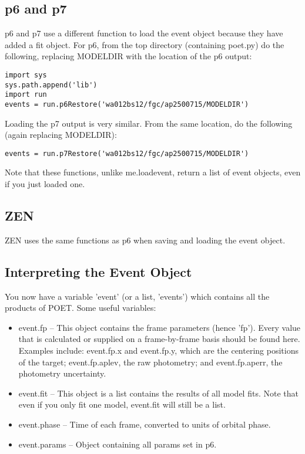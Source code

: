 \documentclass[letterpaper,12pt]{article}
\begin{document}
\subsection{p6 and p7}
p6 and p7 use a different function to load the event object because
they have added a fit object. For p6, from the top directory
(containing poet.py) do the following, replacing MODELDIR with the
location of the p6 output:

\begin{verbatim}
import sys
sys.path.append('lib')
import run
events = run.p6Restore('wa012bs12/fgc/ap2500715/MODELDIR')
\end{verbatim}

Loading the p7 output is very similar. From the same location, do the following
(again replacing MODELDIR):

\begin{verbatim}
events = run.p7Restore('wa012bs12/fgc/ap2500715/MODELDIR')
\end{verbatim}

Note that these functions, unlike me.loadevent, return a list of event
objects, even if you just loaded one.

\subsection{ZEN}
ZEN uses the same functions as p6 when saving and loading the event object.

\subsection{Interpreting the Event Object}
You now have a variable 'event' (or a list, 'events') which contains
all the products of POET. Some useful variables:

\begin{itemize}
\item event.fp -- This object contains the frame parameters (hence
  'fp'). Every value that is calculated or supplied on a
  frame-by-frame basis should be found here. Examples include:
  event.fp.x and event.fp.y, which are the centering positions of the
  target; event.fp.aplev, the raw photometry; and event.fp.aperr, the
  photometry uncertainty.

\item event.fit -- This object is a list contains the results of all model fits.
  Note that even if you only fit one model, event.fit will still be a list.

\item event.phase -- Time of each frame, converted to units of orbital phase.

\item event.params -- Object containing all params set in p6.
\end{itemize}
\end{document}

